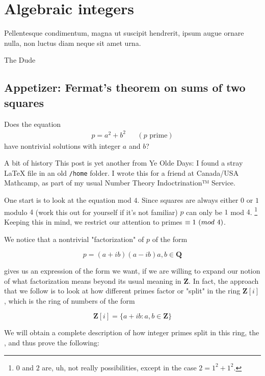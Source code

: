 \chapter{Algebraic integers}

\epigraph{Pellentesque condimentum, magna ut suscipit hendrerit, ipsum augue
  ornare nulla, non luctus diam neque sit amet urna.}{The Dude}

\section{Appetizer: Fermat's theorem on sums of two squares}%
\label{sec:appetizer-fermat's-theorem-on-sums-of-two-squares}

\begin{question}
  Does the equation
  \begin{align}p = a ^ 2 + b ^ 2 &&(p \text{ prime})\end{align} have nontrivial
  solutions with integer \(a\) and \(b\)?
\end{question}

\begin{paragraph}{A bit of history}
  This post is yet another from Ye Olde Days: I found a stray {\LaTeX} file in
  an old \texttt{/home} folder. I wrote this for a friend at Canada/USA
  Mathcamp, as part of my usual Number Theory Indoctrination™ Service.
\end{paragraph}

\medskip\noindent One start is to look at the equation mod \(4\). Since squares
are always either \(0\) or \(1\) modulo \(4\) (work this out for yourself if
it's not familiar) \(p\) can only be \(1\) mod \(4\). \footnote{\(0\) and \(2\)
  are, uh, not really possibilities, except in the case \(2 = 1^2 + 1^2\).}
Keeping this in mind, we restrict our attention to primes \(\equiv 1\ (\mathnormal{mod}\ 4)\).

We notice that a nontrivial "factorization" of \(p\) of the form

\[p=(a+ib)(a-ib) a, b\in{\mathbf Q}\]

gives us an expression of the form we want, if we are willing to expand our
notion of what factorization means beyond its usual meaning in \({\mathbf Z}\).
In fact, the approach that we follow is to look at how different primes factor
or "split" in the ring \({\mathbf Z}[i]\), which is the ring of numbers of the
form

\[ {\mathbf Z}[i] = \{a+ib : a, b\in{\mathbf Z}\} \]

We will obtain a complete description of how integer primes split in this ring,
the , and thus prove the following:

